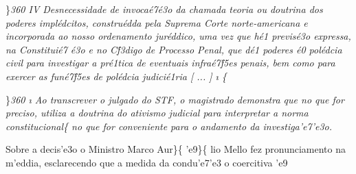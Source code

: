 \par \}\pard \ltrpar{}\qj {}\sl360\widctlpar\wrapdefault\aspalpha\aspnum\faauto\adjustright{} {\rtlch{} \ai{} \ltrch{}  IV 
\endash  Desnecessidade de invoca\'e7\'e3o da chamada teoria ou doutrina dos poderes impl\'edcitos, constru\'edda pela Suprema Corte norte-americana e incorporada ao nosso ordenamento jur\'eddico, uma vez que h\'e1 previs\'e3o expressa, na Constitui\'e7
\'e3o e no C\'f3digo de Processo Penal, que d\'e1 poderes \'e0 pol\'edcia civil para investigar a pr\'e1tica de eventuais infra\'e7\'f5es penais, bem como para exercer as fun\'e7\'f5es de pol\'edcia judici\'e1ria}{\rtlch{} \ai{} \ltrch{} 
  }{\rtlch{} \ai{} \ltrch{}  [}{\rtlch{} \ai{} \ltrch{}  ...}{\rtlch{} \ai{} \ltrch{}  ]}{
\rtlch{} \ai{} \ltrch{} \i{}\super{} }\{\rtlch{}
\ai{} \ltrch{} 
\par \}\pard \ltrpar{}\qj {}\sl360\widctlpar\wrapdefault\aspalpha\aspnum\faauto\adjustright{} {\rtlch{}  \ltrch{} \i{} \tab }{\rtlch{} 
 \ltrch{}  Ao transcrever o julgado do STF, o magistrado demonstra que no que for preciso, utiliza a doutrina do ativismo judicial para interpretar a norma }{\rtlch{}  \ltrch{} 
 constitucional}\{\rtlch{} 
\ltrch{}  no que for conveniente
para o andamento da investiga'e7'e3o. \par \tab Sobre a decis'e3o o
Ministro Marco Aur\}\{\rtlch{}  \ltrch{} 
'e9\}\{\rtlch{}  \ltrch{}
 lio Mello fez pronunciamento na
m'eddia, esclarecendo que a medida da condu'e7'e3 o coercitiva 'e9
